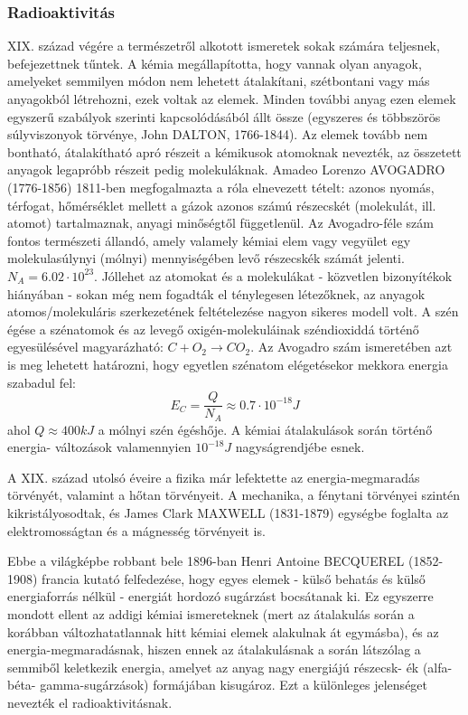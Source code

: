 \documentclass[../main.tex]{subfiles}
\begin{document}
\subsubsection{Radioaktivitás}
 XIX. század végére a természetről alkotott ismeretek sokak számára teljesnek, befejezettnek tűntek. A kémia megállapította, hogy vannak olyan anyagok, amelyeket semmilyen módon nem lehetett átalakítani, szétbontani vagy más anyagokból létrehozni, ezek
voltak az elemek. Minden további anyag ezen elemek egyszerű szabályok szerinti kapcsolódásából állt össze (egyszeres és többszörös súlyviszonyok törvénye, John DALTON,
1766-1844). Az elemek tovább nem bontható, átalakítható apró részeit a kémikusok atomoknak nevezték, az összetett anyagok legapróbb részeit pedig molekuláknak. Amadeo
Lorenzo AVOGADRO (1776-1856) 1811-ben megfogalmazta a róla elnevezett tételt: azonos nyomás, térfogat, hőmérséklet mellett a gázok azonos számú részecskét (molekulát,
ill. atomot) tartalmaznak, anyagi minőségtől függetlenül. Az Avogadro-féle szám fontos természeti állandó, amely valamely kémiai elem vagy vegyület egy molekulasúlynyi
(mólnyi) mennyiségében levő részecskék számát jelenti. $N_A = 6.02 \cdot 10^{23}$. Jóllehet az atomokat és a molekulákat - közvetlen bizonyítékok hiányában - sokan még nem fogadták el ténylegesen létezőknek, az anyagok atomos/molekuláris szerkezetének feltételezése
nagyon sikeres modell volt. A szén égése a szénatomok és az levegő oxigén-molekuláinak széndioxiddá történő egyesülésével magyarázható: $C+O_2 \rightarrow CO_2$. Az Avogadro szám
ismeretében azt is meg lehetett határozni, hogy egyetlen szénatom elégetésekor mekkora energia szabadul fel:
\begin{equation}
    E_C = \frac{Q}{N_A} \approx 0.7 \cdot 10^{-18} J
\end{equation}
ahol $Q \approx 400 kJ$ a mólnyi szén égéshője. A kémiai átalakulások során történő energia-
változások valamennyien $10^{-18} J$ nagyságrendjébe esnek.

A XIX. század utolsó éveire a fizika már lefektette az energia-megmaradás törvényét,
valamint a hőtan törvényeit. A mechanika, a fénytani törvényei szintén kikristályosodtak,
és James Clark MAXWELL (1831-1879) egységbe foglalta az elektromosságtan és a mágnesség törvényeit is.

Ebbe a világképbe robbant bele 1896-ban Henri Antoine BECQUEREL (1852-1908)
francia kutató felfedezése, hogy egyes elemek - külső behatás és külső energiaforrás nélkül
- energiát hordozó sugárzást bocsátanak ki. Ez egyszerre mondott ellent az addigi kémiai
ismereteknek (mert az átalakulás során a korábban változhatatlannak hitt kémiai elemek
alakulnak át egymásba), és az energia-megmaradásnak, hiszen ennek az átalakulásnak a
során látszólag a semmiből keletkezik energia, amelyet az anyag nagy energiájú részecsk-
ék (alfa- béta- gamma-sugárzások) formájában kisugároz. Ezt a különleges jelenséget nevezték el radioaktivitásnak.
\end{document}
